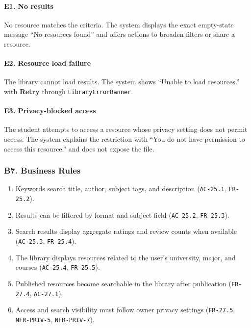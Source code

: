 \documentclass[12pt]{article}
\begin{document}
\hypertarget{sec:e1-no-results}{}
\paragraph*{E1. No results}
\par\medskip

No resource matches the criteria. The system displays the exact empty-state message “No resources found” and offers actions to broaden filters or share a resource.
\par\medskip

\hypertarget{sec:e2-resource-load-failure}{}
\paragraph*{E2. Resource load failure}
\par\medskip

The library cannot load results. The system shows “Unable to load resources.” with \textbf{Retry} through \texttt{LibraryErrorBanner}.
\par\medskip

\hypertarget{sec:e3-privacy-blocked-access}{}
\paragraph*{E3. Privacy-blocked access}
\par\medskip

The student attempts to access a resource whose privacy setting does not permit access. The system explains the restriction with “You do not have permission to access this resource.” and does not expose the file.
\par\medskip

\hypertarget{sec:b7-business-rules}{}
\subsubsection*{B7. Business Rules}
\par\medskip

\begin{enumerate}
\item Keywords search title, author, subject tags, and description (\texttt{AC-25.1}, \texttt{FR-25.2}).
\item Results can be filtered by format and subject field (\texttt{AC-25.2}, \texttt{FR-25.3}).
\item Search results display aggregate ratings and review counts when available (\texttt{AC-25.3}, \texttt{FR-25.4}).
\item The library displays resources related to the user's university, major, and courses (\texttt{AC-25.4}, \texttt{FR-25.5}).
\item Published resources become searchable in the library after publication (\texttt{FR-27.4}, \texttt{AC-27.1}).
\item Access and search visibility must follow owner privacy settings (\texttt{FR-27.5}, \texttt{NFR-PRIV-5}, \texttt{NFR-PRIV-7}).
\end{enumerate}
\par\medskip
\end{document}
